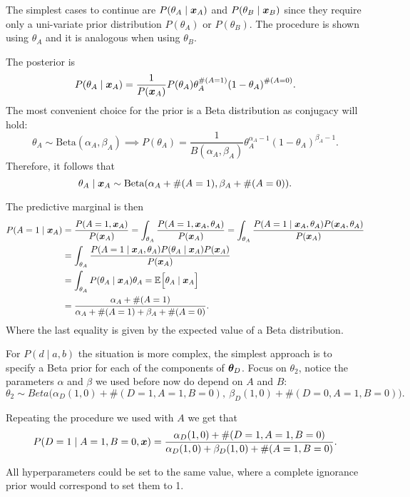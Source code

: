 The simplest cases to continue are \(P(\theta_{A} \mid \bm{x}_{A})\) and
\(P(\theta_{B} \mid \bm{x}_{B})\) since they require only a uni-variate prior distribution
\(P(\theta_{A})\) or \(P(\theta_{B})\). The procedure is shown using \( \theta_A \) and it is analogous when using \( \theta_B \). 

The posterior is
\[
  P(\theta_{A} \mid \bm{x}_{A}) = \frac{1}{P(\bm{x}_{A})}P(\theta_{A})\theta_{A}^{\#(A=1)}{(1-\theta_{A})}^{\#(A=0)}.
\]
The most convenient choice for the prior is a Beta distribution as conjugacy
will hold:
\[
  \theta_{A} \sim \text{Beta}(\alpha_{A}, \beta_{A}) \implies P(\theta_{A})  = \frac{1}{B(\alpha_{A}, \beta_{A})}\theta_{A}^{\alpha_{A}-1}(1-\theta_{A})^{\beta_{A} - 1}.
\]
Therefore, it follows that
\[
  \theta_{A} \mid \bm{x}_{A} \sim \text{Beta}(\alpha_{A} + \#(A=1), \beta_{A} + \#(A = 0)).
\]

The predictive marginal is then
\[
  \begin{aligned}
    P(A = 1 \mid \bm{x}_{A})
    &= \frac{P(A = 1, \bm{x}_{A})}{P(\bm{x}_{A})} = \int_{\theta_{A}}  \frac{P(A = 1, \bm{x}_{A}, \theta_{A})}{P(\bm{x}_{A})} =  \int_{\theta_{A}}  \frac{P(A = 1 \mid \bm{x}_{A}, \theta_{A}) P(\bm{x}_{A}, \theta_{A})}{P(\bm{x}_{A})} \\
    &=  \int_{\theta_{A}}  \frac{P(A = 1 \mid \bm{x}_{A}, \theta_{A}) P(\theta_{A} \mid \bm{x}_{A})P(\bm{x}_{A})}{P(\bm{x}_{A})} \\
    &= \int_{\theta_{A}}P(\theta_{A}\mid \bm{x}_{A})\theta_{A} = \mathbb{E}_{}\Big[\theta_{A} \mid \bm{x}_{A}\Big] \\
    &= \frac{\alpha_{A} + \#(A= 1)}{\alpha_{A} + \#(A=1) + \beta_{A} + \#(A=0)}.
  \end{aligned}
\]
Where the last equality is given by the expected value of a Beta distribution.

For \(P(d \mid a ,b)\) the situation is more complex, the simplest approach
is to specify a Beta prior for each of the components of \(\bm{\theta}_{D}\).
Focus on \(\theta_{2}\), notice the parameters \(\alpha\)
and \(\beta\) we used before now do depend on \(A\) and \(B\):
\[
  \theta_{2} \sim Beta\Big(\alpha_{D}(1,0) + \#(D = 1, A = 1, B = 0), \ \beta_{D}(1,0) + \#(D = 0, A = 1, B = 0)\Big).
\]

Repeating the procedure we used with \(A\) we get that
\[
  P(D = 1 \mid A = 1, B = 0, \bm{x}) = \frac{\alpha_{D}(1,0) + \#(D = 1, A = 1, B = 0)}{\alpha_{D}(1,0) + \beta_{D}(1,0) + \#(A=1, B = 0)}.
\]

All hyperparameters could be set to the same
value, where a complete ignorance prior would correspond to set them to 1.

